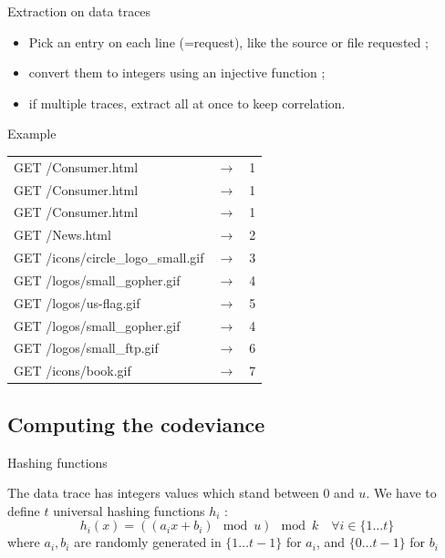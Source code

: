\documentclass[mathserif]{beamer}
\begin{document}
	\begin{frame}{Extraction on data traces}
		\begin{block}{}
			\begin{itemize}
				\item Pick an entry on each line (=request), like the source or file requested ;
				\item convert them to integers using an injective function ;
				\item if multiple traces, extract all at once to keep correlation.
			\end{itemize}
		\end{block}
		
		\begin{exampleblock}{Example}
	\scriptsize
	
\begin{tabular}{lcr}
GET /Consumer.html & $\longrightarrow$ & 1\\
GET /Consumer.html & $\longrightarrow$ & 1\\
GET /Consumer.html & $\longrightarrow$ & 1\\
GET /News.html & $\longrightarrow$ & 2\\
GET /icons/circle\_logo\_small.gif & $\longrightarrow$ & 3\\
GET /logos/small\_gopher.gif & $\longrightarrow$ & 4\\
GET /logos/us-flag.gif & $\longrightarrow$ & 5\\
GET /logos/small\_gopher.gif & $\longrightarrow$ & 4\\
GET /logos/small\_ftp.gif & $\longrightarrow$ & 6\\
GET /icons/book.gif & $\longrightarrow$ & 7\\
\end{tabular}	
	
	\end{exampleblock}		
		
	\end{frame}
	
	\subsection{Computing the codeviance}
	
	\begin{frame}{Hashing functions}
	
	\begin{block}{}
	The data trace has integers values which stand between $0$ and $u$. We have to define $t$ universal hashing functions $h_i$ :
	\[ h_i(x) = ((a_ix+b_i) \mod u) \mod k \quad \forall i \in \lbrace 1 \ldots t \rbrace \]
where $a_i, b_i$ are randomly generated in $\lbrace 1 \dots t-1 \rbrace$ for $a_i$, and $\lbrace 0 \ldots t-1 \rbrace$ for $b_i$
	\end{block}
	
	\end{frame}
	
\end{document}
